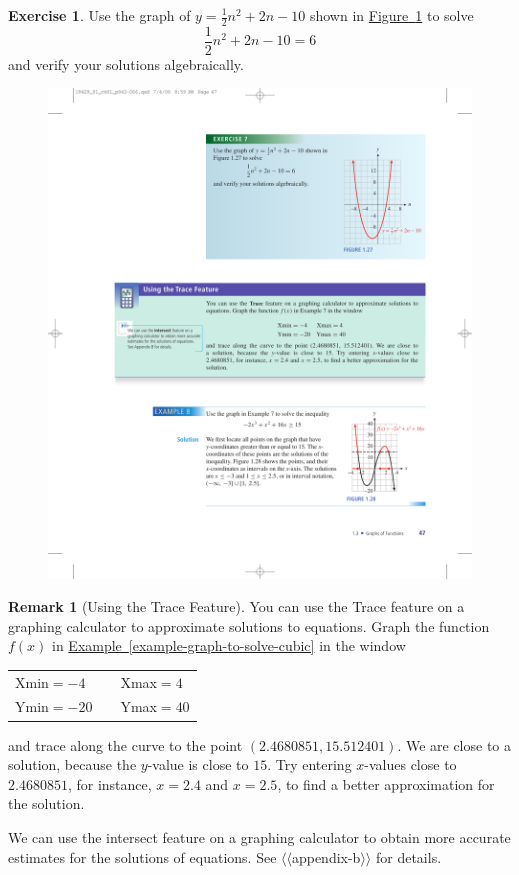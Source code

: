 \documentclass[10pt,]{book}
\theoremstyle{plain}
\theoremstyle{definition}
\newtheorem{remark}[theorem]{Remark}
\theoremstyle{definition}
\theoremstyle{definition}
\theoremstyle{definition}
\newtheorem{exercise}[theorem]{Exercise}
\numberwithin{equation}{part}
\begin{document}
\begin{exercise}\label{exercise-graph-to-solve-quadratic}
Use the graph of \(y = \frac{1}{2}n^2 + 2n - 10\) shown in \hyperref[fig-graph-to-solve-quadratic]{Figure~\ref{fig-graph-to-solve-quadratic}} to solve%
\begin{equation*}
\frac{1}{2}n^2 + 2n - 10 = 6
\end{equation*}
and verify your solutions algebraically. \begin{figure}
\centering
\includegraphics[width=0.6\linewidth]{images/fig-graph-to-solve-quadratic}
\caption{\label{fig-graph-to-solve-quadratic}}
\end{figure}
\end{exercise}
\begin{remark}[Using the Trace Feature]\label{remark-7}
You can use the Trace feature on a graphing calculator to approximate solutions to equations. Graph the function \(f(x)\) in \hyperref[example-graph-to-solve-cubic]{Example~\ref{example-graph-to-solve-cubic}}  in the window \begin{table}
\centering
\begin{tabular}{lll}
Xmin\(=-4\)&&Xmax\(=4\)\tabularnewline[0pt]
Ymin\(=-20\)&&Ymax\(=40\)
\end{tabular}
\end{table}
 and trace along the curve to the point \((2.4680851, 15.512401)\). We are close to a solution, because the \(y\)-value is close to \(15\). Try entering \(x\)-values close to \(2.4680851\), for instance, \(x = 2.4\) and \(x = 2.5\), to find a better approximation for the solution.%
\par
We can use the intersect feature on a graphing calculator to obtain more accurate estimates for the solutions of equations. See {$\langle\langle$appendix-b$\rangle\rangle$} for details.%
\end{remark}
\end{document}
